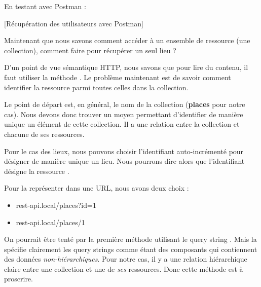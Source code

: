 \documentclass[big]{zmdocument}
\begin{document}
En testant avec Postman :



[Récupération des utilisateurs avec Postman]








\begin{Question}
Maintenant que nous savons comment accéder à un ensemble de ressource (une collection), comment faire pour récupérer un seul lieu ?
\end{Question}


D'un point de vue sémantique HTTP, nous savons que pour lire du contenu, il faut utiliser la méthode . Le problème maintenant est de savoir comment identifier la ressource parmi toutes celles dans la collection.



Le point de départ est, en général, le nom de la collection (\textbf{places} pour notre cas). Nous devons donc trouver un moyen permettant d'identifier de manière unique un élément de cette collection. Il a une relation entre la collection et chacune de ses ressources.



Pour le cas des lieux, nous pouvons choisir l'identifiant auto-incrémenté pour désigner de manière unique un lieu. Nous pourrons dire alors que l'identifiant  désigne la ressource .



Pour la représenter dans une URL, nous avons deux choix :



\begin{itemize}
\item rest-api.local/places?id=1
\item rest-api.local/places/1
\end{itemize}


On pourrait être tenté par la première méthode utilisant le query string . Mais la  spécifie clairement les query strings comme étant des composants qui contiennent des données \textit{non-hiérarchiques}.
Pour notre cas, il y a une relation hiérarchique claire entre une collection et une de \textit{ses} ressources. Donc cette méthode est à proscrire.
\end{document}
